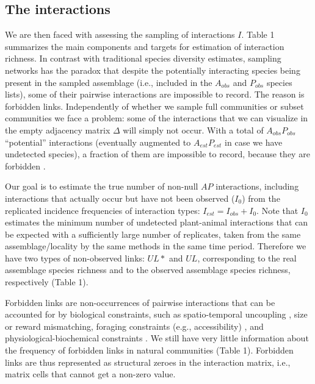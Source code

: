 \documentclass[12pt]{article}
\begin{document}

\subsection*{The interactions}

We are then faced with assessing the sampling of interactions $I$. Table 1 summarizes the main components and targets for estimation of interaction richness. In contrast with traditional species diversity estimates, sampling networks has the paradox that despite the potentially interacting species being present in the sampled assemblage (i.e., included in the $A_{obs}$ and $P_{obs}$ species lists), some of their pairwise interactions are impossible to record. The reason is forbidden links. Independently of whether we sample full communities or subset communities we face a problem: some of the interactions that we can visualize in the empty adjacency matrix $\Delta$ will simply not occur. With a total of $A_{obs}P_{obs}$ ``potential'' interactions (eventually augmented to $A_{est}P_{est}$ in case we have undetected species), a fraction of them are impossible to record, because they are forbidden \citep{E31.7324_PDF,Olesen:2011a}. 

Our goal is to estimate the true number of non-null $AP$ interactions, including interactions that actually occur but have not been observed ($I_0$) from the replicated incidence frequencies of interaction types: $I_{est} = I_{obs} + I_0$. Note that $I_0$ estimates the minimum number of undetected plant-animal interactions that can be expected with a sufficiently large number of replicates, taken from the same assemblage/locality by the same methods in the same time period. Therefore we have two types of non-observed links: $UL*$ and $UL$, corresponding to the real assemblage species richness and to the observed assemblage species richness, respectively (Table 1).  

Forbidden links are non-occurrences of pairwise interactions that can be accounted for by biological constraints, such as spatio-temporal uncoupling \citep{E31/2562}, size or reward mismatching, foraging constraints (e.g., accessibility) \citep{More:2012kx}, and physiological-biochemical constraints \citep{E31/2562}. We still have very little information about the frequency of forbidden links in natural communities \citep{E31.7324_PDF,Stang:2009cx,Vazquez:2009p82,Olesen:2011a,Ibanez:2012eu,Maruyama:2014gt,Vizentin-Bugoni:2014hc} (Table 1). Forbidden links are thus represented as structural zeroes in the interaction matrix, i.e., matrix cells that cannot get a non-zero value. 
\end{document}
